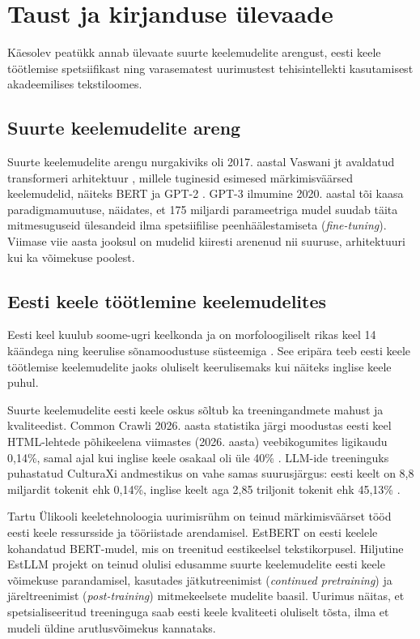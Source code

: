 \section{Taust ja kirjanduse ülevaade} \label{taust}

Käesolev peatükk annab ülevaate suurte keelemudelite arengust, eesti keele töötlemise spetsiifikast ning varasematest uurimustest tehisintellekti kasutamisest akadeemilises tekstiloomes.

\subsection{Suurte keelemudelite areng} \label{subsec:llm-areng}

Suurte keelemudelite arengu nurgakiviks oli 2017. aastal Vaswani jt avaldatud transformeri arhitektuur \cite{vaswani2017attention}, millele tuginesid esimesed märkimisväärsed keelemudelid, näiteks BERT \cite{devlin2019bert} ja GPT-2 \cite{radford2019language}. GPT-3 ilmumine 2020. aastal \cite{brown2020language} tõi kaasa paradigmamuutuse, näidates, et 175 miljardi parameetriga mudel suudab täita mitmesuguseid ülesandeid ilma spetsiifilise peenhäälestamiseta (\textit{fine-tuning}). Viimase viie aasta jooksul on mudelid kiiresti arenenud nii suuruse, arhitektuuri kui ka võimekuse poolest.

\subsection{Eesti keele töötlemine keelemudelites} \label{subsec:eesti-keel}

Eesti keel kuulub soome-ugri keelkonda ja on morfoloogiliselt rikas keel 14 käändega ning keerulise sõnamoodustuse süsteemiga \cite{erelt2007eesti}. See eripära teeb eesti keele töötlemise keelemudelite jaoks oluliselt keerulisemaks kui näiteks inglise keele puhul.

Suurte keelemudelite eesti keele oskus sõltub ka treeningandmete mahust ja kvaliteedist. Common Crawli 2026. aasta statistika järgi moodustas eesti keel HTML-lehtede põhikeelena viimastes (2026. aasta) veebikogumites ligikaudu 0,14\%, samal ajal kui inglise keele osakaal oli üle 40\% \cite{commoncrawl2026languages}. LLM-ide treeninguks puhastatud CulturaXi andmestikus on vahe samas suurusjärgus: eesti keelt on 8,8 miljardit tokenit ehk 0,14\%, inglise keelt aga 2,85 triljonit tokenit ehk 45,13\% \cite{nguyen2024culturax}.

Tartu Ülikooli keeletehnoloogia uurimisrühm on teinud märkimisväärset tööd eesti keele ressursside ja tööriistade arendamisel. EstBERT \cite{tanvir2021estbert} on eesti keelele kohandatud BERT-mudel, mis on treenitud eestikeelsel tekstikorpusel. Hiljutine EstLLM projekt \cite{dorkin2026estllm} on teinud olulisi edusamme suurte keelemudelite eesti keele võimekuse parandamisel, kasutades jätkutreenimist (\textit{continued pretraining}) ja järeltreenimist (\textit{post-training}) mitmekeelsete mudelite baasil. Uurimus näitas, et spetsialiseeritud treeninguga saab eesti keele kvaliteeti oluliselt tõsta, ilma et mudeli üldine arutlusvõimekus kannataks.

